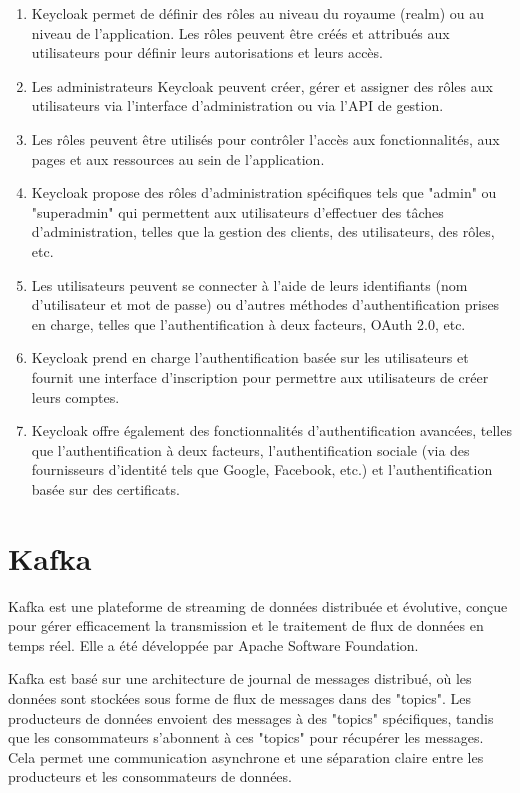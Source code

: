 \begin{enumerate}
	\item Keycloak permet de définir des rôles au niveau du royaume (realm) ou au niveau de l'application. Les rôles peuvent être créés et attribués aux utilisateurs pour définir leurs autorisations et leurs accès.
	\item Les administrateurs Keycloak peuvent créer, gérer et assigner des rôles aux utilisateurs via l'interface d'administration ou via l'API de gestion.
	\item Les rôles peuvent être utilisés pour contrôler l'accès aux fonctionnalités, aux pages et aux ressources au sein de l'application.
	\item Keycloak propose des rôles d'administration spécifiques tels que "admin" ou "superadmin" qui permettent aux utilisateurs d'effectuer des tâches d'administration, telles que la gestion des clients, des utilisateurs, des rôles, etc.
	\item Les utilisateurs peuvent se connecter à l'aide de leurs identifiants (nom d'utilisateur et mot de passe) ou d'autres méthodes d'authentification prises en charge, telles que l'authentification à deux facteurs, OAuth 2.0, etc.
	\item Keycloak prend en charge l'authentification basée sur les utilisateurs et fournit une interface d'inscription pour permettre aux utilisateurs de créer leurs comptes.
	\item Keycloak offre également des fonctionnalités d'authentification avancées, telles que l'authentification à deux facteurs, l'authentification sociale (via des fournisseurs d'identité tels que Google, Facebook, etc.) et l'authentification basée sur des certificats.
\end{enumerate}

\section{Kafka}

Kafka est une plateforme de streaming de données distribuée et évolutive, conçue pour gérer efficacement la transmission et le traitement de flux de données en temps réel. Elle a été développée par Apache Software Foundation.

Kafka est basé sur une architecture de journal de messages distribué, où les données sont stockées sous forme de flux de messages dans des "topics". Les producteurs de données envoient des messages à des "topics" spécifiques, tandis que les consommateurs s'abonnent à ces "topics" pour récupérer les messages. Cela permet une communication asynchrone et une séparation claire entre les producteurs et les consommateurs de données.

